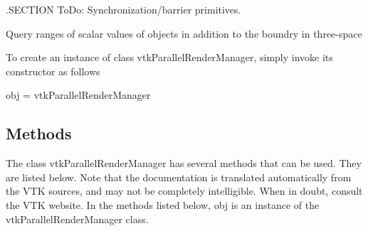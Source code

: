 .S\-E\-C\-T\-I\-O\-N To\-Do\-: Synchronization/barrier primitives.

Query ranges of scalar values of objects in addition to the boundry in three-\/space

To create an instance of class vtk\-Parallel\-Render\-Manager, simply invoke its constructor as follows \begin{DoxyVerb}  obj = vtkParallelRenderManager
\end{DoxyVerb}
 \hypertarget{vtkwidgets_vtkxyplotwidget_Methods}{}\subsection{Methods}\label{vtkwidgets_vtkxyplotwidget_Methods}
The class vtk\-Parallel\-Render\-Manager has several methods that can be used. They are listed below. Note that the documentation is translated automatically from the V\-T\-K sources, and may not be completely intelligible. When in doubt, consult the V\-T\-K website. In the methods listed below, {\ttfamily obj} is an instance of the vtk\-Parallel\-Render\-Manager class. 
